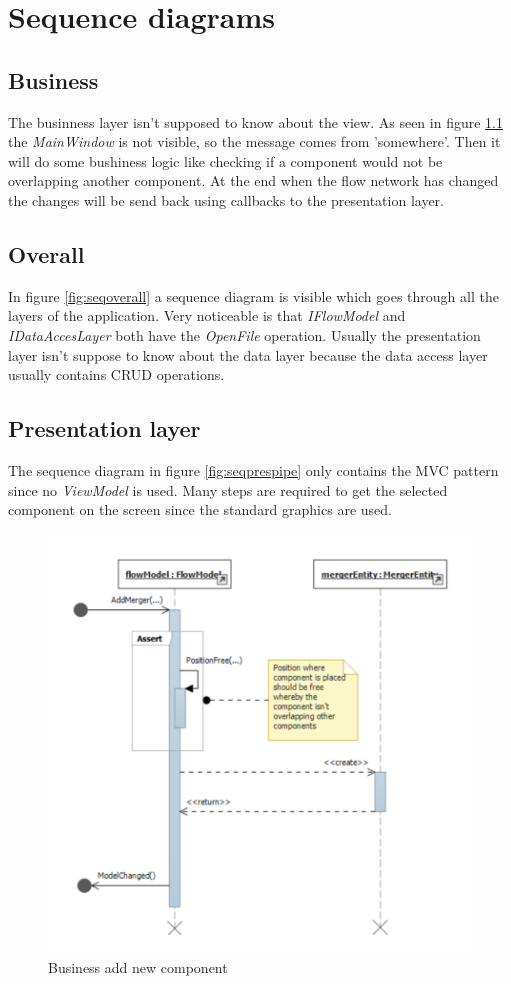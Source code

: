 \chapter{Sequence diagrams}
\section{Business}
The businness layer isn't supposed to know about the view. As seen in figure \ref{fig:seqbus} the \emph{MainWindow} is not visible, so the message comes from 'somewhere'. Then it will do some bushiness logic like checking if a component would not be overlapping another component. At the end when the flow network has changed the changes will be send back using callbacks to the presentation layer.

\section{Overall}
In figure \ref{fig:seqoverall} a sequence diagram is visible which goes through all the layers of the application. Very noticeable is that \emph{IFlowModel} and \emph{IDataAccesLayer} both have the \emph{OpenFile} operation. Usually the presentation layer isn't suppose to know about the data layer because the data access layer usually contains CRUD operations.

\section{Presentation layer}
The sequence diagram in figure \ref{fig:seqprespipe} only contains the MVC pattern since no \emph{ViewModel} is used. Many steps are required to get the selected component on the screen since the standard graphics are used.

\begin{figure}[h!]
	\centering
	\includegraphics{figures/BusinessAddNewComponent.pdf}
	\caption{Business add new component}
	\label{fig:seqbus}
\end{figure}

